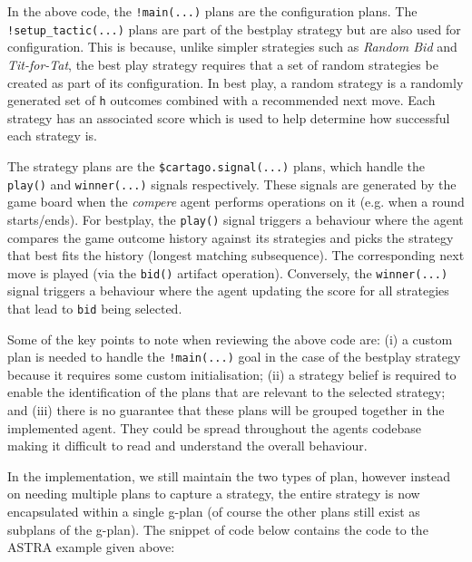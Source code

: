 In the above code, the \verb|!main(...)| plans are the configuration plans. The \verb|!setup_tactic(...)| 
plans are part of the bestplay strategy but are also used for configuration. This is because, unlike
simpler strategies such as \emph{Random Bid} and \emph{Tit-for-Tat}, the best play strategy requires 
that a set of random strategies be created as part of its configuration. In best play, a random strategy is
a randomly generated set of \verb|h| outcomes combined with a recommended next move. Each strategy has 
an associated score which is used to help determine how successful each strategy is.

The strategy plans are the \verb|$cartago.signal(...)| plans, which handle the \verb|play()| 
and \verb|winner(...)| signals respectively. These signals are generated by the game board when 
the  \emph{compere} agent performs operations on it (e.g. when a round starts/ends). For bestplay, the 
\verb|play()| signal triggers a behaviour where the agent compares the game outcome history against 
its strategies and picks the strategy that best fits the history (longest matching subsequence). The
corresponding next move is played (via the \verb|bid()| artifact operation). Conversely, the 
\verb|winner(...)| signal triggers a behaviour where the agent updating the score for all 
strategies that lead to \verb|bid| being selected.

Some of the key points to note when reviewing the above code are: (i) a custom plan is needed 
to handle the \verb|!main(...)| goal in the case of the bestplay strategy because it requires
some custom initialisation; (ii) a strategy belief is required to enable the identification of the
plans that are relevant to the selected strategy; and (iii) there is no guarantee that these
plans will be grouped together in the implemented agent. They could be spread throughout the
agents codebase making it difficult to read and understand the overall behaviour.

In the {\aser} implementation, we still maintain the two types of plan, however instead on needing
multiple plans to capture a strategy, the entire strategy is now encapsulated within a single
g-plan (of course the other plans still exist as subplans of the g-plan). The snippet of code 
below contains the {\aser} code to the ASTRA example given above:

